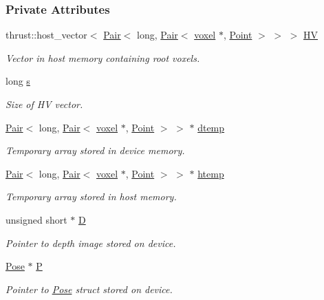 \subsubsection*{Private Attributes}
\begin{DoxyCompactItemize}
\item 
thrust\+::host\+\_\+vector$<$ \hyperlink{classPair}{Pair}$<$ long, \hyperlink{classPair}{Pair}$<$ \hyperlink{classvoxel}{voxel} $\ast$, \hyperlink{structPoint}{Point} $>$ $>$ $>$ \hyperlink{classGPU__FE_a7418d50e4e22db3671d9c000344aaddc}{HV}
\begin{DoxyCompactList}\small\item\em Vector in host memory containing root voxels. \end{DoxyCompactList}\item 
long \hyperlink{classGPU__FE_a0bd3424bf1e7775fc5eef2d17714cd94}{s}
\begin{DoxyCompactList}\small\item\em Size of HV vector. \end{DoxyCompactList}\item 
\hyperlink{classPair}{Pair}$<$ long, \hyperlink{classPair}{Pair}$<$ \hyperlink{classvoxel}{voxel} $\ast$, \hyperlink{structPoint}{Point} $>$ $>$ $\ast$ \hyperlink{classGPU__FE_a15cab1132ca16d50844a60cc09235567}{dtemp}
\begin{DoxyCompactList}\small\item\em Temporary array stored in device memory. \end{DoxyCompactList}\item 
\hyperlink{classPair}{Pair}$<$ long, \hyperlink{classPair}{Pair}$<$ \hyperlink{classvoxel}{voxel} $\ast$, \hyperlink{structPoint}{Point} $>$ $>$ $\ast$ \hyperlink{classGPU__FE_afd39eabc36a87a6cde62b57296efcc8a}{htemp}
\begin{DoxyCompactList}\small\item\em Temporary array stored in host memory. \end{DoxyCompactList}\item 
unsigned short $\ast$ \hyperlink{classGPU__FE_a20be80d2f552afc21f97831fcc4983e9}{D}
\begin{DoxyCompactList}\small\item\em Pointer to depth image stored on device. \end{DoxyCompactList}\item 
\hyperlink{structPose}{Pose} $\ast$ \hyperlink{classGPU__FE_a1a99fc5bf3cc72c1d39f779e632f5fe7}{P}
\begin{DoxyCompactList}\small\item\em Pointer to \hyperlink{structPose}{Pose} struct stored on device. \end{DoxyCompactList}\item 

\end{DoxyCompactItemize}
